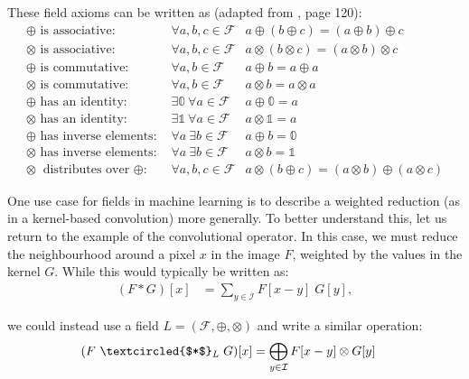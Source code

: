 \documentclass[a4paper, 12pt]{report}
\begin{document}
These field axioms can be written as (adapted from \cite{beachy2006abstract}, page 120):
\begin{align}
\textrm{$\oplus$ is associative: }&\forall a,b,c\in \mathcal{F} &  a \oplus (b \oplus c) = (a\oplus b) \oplus c \\ 
\textrm{$\otimes$ is associative: }&\forall a,b,c\in \mathcal{F} &  a \otimes (b \otimes c) = (a\otimes b) \otimes c \\ 
\textrm{$\oplus$ is commutative: }&\forall a,b\in \mathcal{F} & a\oplus b = a  \oplus a \\
\textrm{$\otimes$ is commutative: }&\forall a,b\in \mathcal{F} & a\otimes b = a  \otimes a \\
\oplus\textrm{ has an identity: }& \exists \mathbb{0} ~\forall a\in \mathcal{F} & a\oplus \mathbb{0} = a \\ 
\otimes\textrm{ has an identity: }& \exists \mathbb{1} ~\forall a\in \mathcal{F} & a\otimes \mathbb{1} = a \\ 
\oplus\textrm{ has inverse elements: }& \forall a~\exists b\in \mathcal{F} & a\oplus b = \mathbb{0} \label{eq:additive-inverse}  \\ 
\otimes\textrm{ has inverse elements: }& \forall a~\exists b\in \mathcal{F} & a\otimes b = \mathbb{1}  \\ 
\otimes \textrm{ distributes over $\oplus$: }&\forall a,b,c\in \mathcal{F} & a\otimes (b \oplus c) = (a\otimes b)\oplus(a\otimes c)
\end{align}

One use case for fields in machine learning is to describe a weighted reduction (as in a kernel-based convolution) more generally. To better understand this, let us return to the example of the convolutional operator. In this case, we must reduce the neighbourhood around a pixel $x$ in the image $F$, weighted by the values in the kernel $G$. While this would typically be written as:
\begin{align}
	(F*G)[x] &= \sum_{y\in\mathcal{I}} F[x-y]\; G[y],
\end{align}


we could instead use a field $L=(\mathcal{F}, \oplus, \otimes)$ and write a similar operation:
\begin{align}
	(F ~\textcircled{$*$}_L\; G)[x] &=\bigoplus_{y\in \mathcal{I}} F[x-y] \otimes G[y] \label{eq:semifield-conv}
\end{align}
\end{document}
